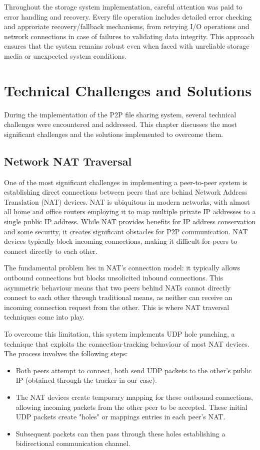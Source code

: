 \documentclass[12pt,a4paper]{report}
\begin{document}
Throughout the storage system implementation, careful attention was paid to error handling and recovery. Every file operation includes detailed error checking and approriate recovery/fallback mechanisms, from retrying I/O operations and network connections in case of failures to validating data integrity. This approach ensures that the system remains robust even when faced with unreliable storage media or unexpected system conditions.

\chapter{Technical Challenges and Solutions}
During the implementation of the P2P file sharing system, several technical challenges were encountered and addressed. This chapter discusses the most significant challenges and the solutions implemented to overcome them.

\section{Network NAT Traversal}

One of the most significant challenges in implementing a peer-to-peer system is establishing direct connections between peers that are behind Network Address Translation (NAT) devices. NAT is ubiquitous in modern networks, with almost all home and office routers employing it to map multiple private IP addresses to a single public IP address. While NAT provides benefits for IP address conservation and some security, it creates significant obstacles for P2P communication. NAT devices typically block incoming connections, making it difficult for peers to connect directly to each other.

The fundamental problem lies in NAT's connection model: it typically allows outbound connections but blocks unsolicited inbound connections. This asymmetric behaviour means that two peers behind NATs cannot directly connect to each other through traditional means, as neither can receive an incoming connection request from the other. This is where NAT traversal techniques come into play.

To overcome this limitation, this system implements UDP hole punching, a technique that exploits the connection-tracking behaviour of most NAT devices. The process involves the following steps:
\begin{itemize}
	\item Both peers attempt to connect, both send UDP packets to the other's public IP (obtained through the tracker in our case).
	\item The NAT devices create temporary mapping for these outbound connections, allowing incoming packets from the other peer to be accepted. These initial UDP packets create "holes" or mappings entries in each peer's NAT.
	\item Subsequent packets can then pass through these holes establishing a bidirectional communication channel.
\end{itemize}
\end{document}
